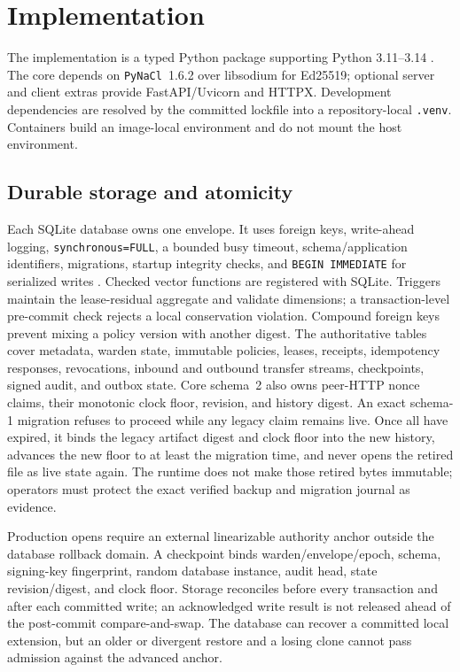 \documentclass[10pt]{article}
\newcommand{\code}[1]{\nolinkurl{#1}}
\begin{document}
\section{Implementation}

The implementation is a typed Python package supporting Python 3.11--3.14 \citep{lets2026}. The
core depends on \code{PyNaCl}~1.6.2 over libsodium for Ed25519; optional server and client extras
provide FastAPI/Uvicorn and HTTPX. Development dependencies are resolved by the committed lockfile
into a repository-local \code{.venv}. Containers build an image-local environment and do not mount
the host environment.

\subsection{Durable storage and atomicity}

Each SQLite database owns one envelope. It uses foreign keys, write-ahead logging,
\code{synchronous=FULL}, a bounded busy timeout, schema/application identifiers, migrations,
startup integrity checks, and \texttt{BEGIN IMMEDIATE} for serialized writes \citep{sqlitewal}.
Checked vector functions are registered with SQLite. Triggers maintain the lease-residual
aggregate and validate dimensions; a transaction-level pre-commit check rejects a local
conservation violation. Compound foreign keys prevent mixing a policy version with another digest.
The authoritative tables cover metadata, warden state, immutable policies, leases, receipts,
idempotency responses, revocations, inbound and outbound transfer streams, checkpoints, signed
audit, and outbox state. Core schema~2 also owns peer-HTTP nonce claims, their monotonic clock
floor, revision, and history digest. An exact schema-1 migration refuses to proceed while any
legacy claim remains live. Once all have expired, it binds the legacy artifact digest and clock
floor into the new history, advances the new floor to at least the migration time, and never opens
the retired file as live state again. The runtime does not make those retired bytes immutable;
operators must protect the exact verified backup and migration journal as evidence.

Production opens require an external linearizable authority anchor outside the database rollback
domain. A checkpoint binds warden/envelope/epoch, schema, signing-key fingerprint, random database
instance, audit head, state revision/digest, and clock floor. Storage reconciles before every
transaction and after each committed write; an acknowledged write result is not released ahead of
the post-commit compare-and-swap.
The database can recover a committed local extension, but an older or divergent restore and a
losing clone cannot pass admission against the advanced anchor.
\end{document}
